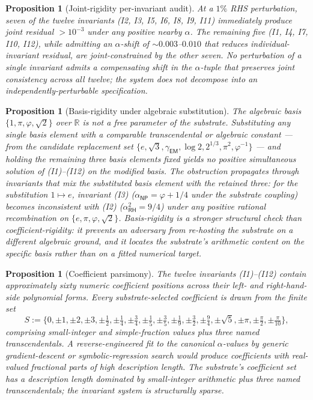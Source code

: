 \documentclass[11pt,a4paper]{amsart}
\theoremstyle{plain}
\newtheorem{proposition}[theorem]{Proposition}
\theoremstyle{definition}
\begin{document}
\begin{proposition}[Joint-rigidity per-invariant audit]\label{prop:joint-rigidity}
At a $1\%$ RHS perturbation, seven of the twelve invariants (I2, I3, I5, I6, I8, I9, I11) immediately produce joint residual $> 10^{-3}$ under any positive nearby $\alpha$. The remaining five (I1, I4, I7, I10, I12), while admitting an $\alpha$-shift of $\sim 0.003$--$0.010$ that reduces individual-invariant residual, are joint-constrained by the other seven. No perturbation of a single invariant admits a compensating shift in the $\alpha$-tuple that preserves joint consistency across all twelve; the system does not decompose into an independently-perturbable specification.
\end{proposition}

\begin{proposition}[Basis-rigidity under algebraic substitution]\label{prop:basis-rigidity}
The algebraic basis $\{1, \pi, \varphi, \sqrt{2}\}$ over $\mathbb{R}$ is not a free parameter of the substrate. Substituting any single basis element with a comparable transcendental or algebraic constant --- from the candidate replacement set $\{e, \sqrt{3}, \gamma_{\textsf{EM}}, \log 2, 2^{1/3}, \pi^{2}, \varphi^{-1}\}$ --- and holding the remaining three basis elements fixed yields no positive simultaneous solution of \textup{(I1)--(I12)} on the modified basis. The obstruction propagates through invariants that mix the substituted basis element with the retained three: for the substitution $1 \mapsto e$, invariant \textup{(I3)} ($\alpha_{\textsf{NP}} = \varphi + 1/4$ under the substrate coupling) becomes inconsistent with \textup{(I2)} ($\alpha_{\textsf{RH}}^{2} = 9/4$) under any positive rational recombination on $\{e, \pi, \varphi, \sqrt{2}\}$. Basis-rigidity is a stronger structural check than coefficient-rigidity: it prevents an adversary from re-hosting the substrate on a different algebraic ground, and it locates the substrate's arithmetic content on the specific basis rather than on a fitted numerical target.
\end{proposition}

\begin{proposition}[Coefficient parsimony]\label{prop:coeff-parsimony}
The twelve invariants \textup{(I1)--(I12)} contain approximately sixty numeric coefficient positions across their left- and right-hand-side polynomial forms. Every substrate-selected coefficient is drawn from the finite set
\[
S := \{0, \pm 1, \pm 2, \pm 3, \pm \tfrac{1}{2}, \pm \tfrac{1}{4}, \pm \tfrac{3}{4}, \pm \tfrac{1}{5}, \pm \tfrac{3}{5}, \pm \tfrac{1}{9}, \pm \tfrac{3}{2}, \pm \tfrac{9}{4}, \pm \sqrt{5}, \pm \pi, \pm \tfrac{\pi}{2}, \pm \tfrac{\pi}{10}\},
\]
comprising small-integer and simple-fraction values plus three named transcendentals. A reverse-engineered fit to the canonical $\alpha$-values by generic gradient-descent or symbolic-regression search would produce coefficients with real-valued fractional parts of high description length. The substrate's coefficient set has a description length dominated by small-integer arithmetic plus three named transcendentals; the invariant system is structurally sparse.
\end{proposition}
\end{document}
